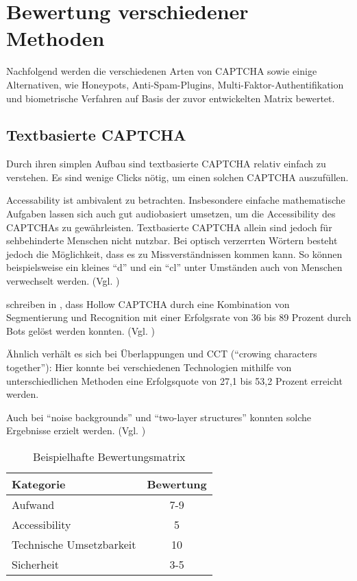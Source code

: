 \chapter{Bewertung verschiedener Methoden}

Nachfolgend werden die verschiedenen Arten von CAPTCHA sowie einige Alternativen, wie Honeypots, Anti-Spam-Plugins, 
Multi-Faktor-Authentifikation und biometrische Verfahren auf Basis der zuvor entwickelten Matrix bewertet. 

\section{Textbasierte CAPTCHA}

Durch ihren simplen Aufbau sind textbasierte CAPTCHA relativ einfach zu verstehen.
Es sind wenige Clicks nötig, um einen solchen CAPTCHA auszufüllen. 

Accessability ist ambivalent zu betrachten.
Insbesondere einfache mathematische Aufgaben lassen sich auch gut audiobasiert umsetzen, 
um die Accessibility des CAPTCHAs zu gewährleisten.
Textbasierte CAPTCHA allein sind jedoch für sehbehinderte Menschen nicht nutzbar.
Bei optisch verzerrten Wörtern besteht jedoch die Möglichkeit, dass es zu Missverständnissen kommen kann.
So können beispielsweise ein kleines ``d'' und ein ``cl'' unter Umständen auch von Menschen verwechselt werden. (Vgl. \cite[p.3]{usabilityofcaptchas})

\citeauthor{surveyofresearch} schreiben in \cite[p.xx]{surveyofresearch}, 
dass Hollow CAPTCHA durch eine Kombination von Segmentierung und Recognition %
mit einer Erfolgsrate von 36 bis 89 Prozent durch Bots gelöst werden konnten. (Vgl. \cite{gao}) %

Ähnlich verhält es sich bei Überlappungen und CCT (``crowing characters together''):
Hier konnte bei verschiedenen Technologien mithilfe von unterschiedlichen Methoden
eine Erfolgsquote von 27,1 bis 53,2 Prozent erreicht werden. \cite[p.xx]{surveyofresearch} %

Auch bei ``noise backgrounds'' und ``two-layer structures'' konnten solche Ergebnisse erzielt werden. 
(Vgl. \cite[p.xx]{surveyofresearch} \cite{gao})


\begin{table}[h!]
    \caption{Beispielhafte Bewertungsmatrix}
    \begin{center}
        \begin{tabular}{l|c}
            Kategorie                       & Bewertung \\\hline
            Aufwand                         & 7-9         \\
            Accessibility                   & 5        \\
            Technische Umsetzbarkeit        & 10         \\
            Sicherheit                      & 3-5         
        \end{tabular}
    \end{center}
\end{table}

